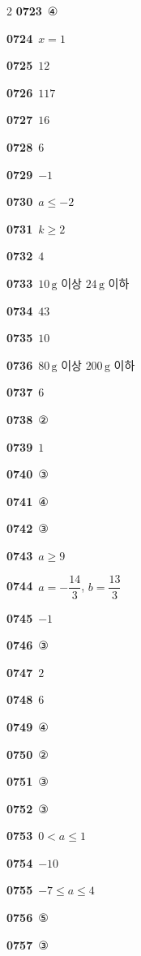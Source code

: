 \documentclass[10pt,a4paper]{article}
\begin{document}
\begin{multicols}{2}
\noindent\textbf{0723}\ ④\par
\noindent\textbf{0724}\ $x=1$\par
\noindent\textbf{0725}\ $12$\par
\noindent\textbf{0726}\ $117$\par
\noindent\textbf{0727}\ $16$\par
\noindent\textbf{0728}\ $6$\par
\noindent\textbf{0729}\ $-1$\par
\noindent\textbf{0730}\ $a\le -2$\par
\noindent\textbf{0731}\ $k\ge 2$\par
\noindent\textbf{0732}\ $4$\par
\noindent\textbf{0733}\ $10\,\mathrm{g}$ 이상 $24\,\mathrm{g}$ 이하\par
\noindent\textbf{0734}\ $43$\par
\noindent\textbf{0735}\ $10$\par
\noindent\textbf{0736}\ $80\,\mathrm{g}$ 이상 $200\,\mathrm{g}$ 이하\par
\noindent\textbf{0737}\ $6$\par
\noindent\textbf{0738}\ ②\par
\noindent\textbf{0739}\ $1$\par
\noindent\textbf{0740}\ ③\par
\noindent\textbf{0741}\ ④\par
\noindent\textbf{0742}\ ③\par
\noindent\textbf{0743}\ $a\ge 9$\par
\noindent\textbf{0744}\ $a=-\dfrac{14}{3}$, $b=\dfrac{13}{3}$\par
\noindent\textbf{0745}\ $-1$\par
\noindent\textbf{0746}\ ③\par
\noindent\textbf{0747}\ $2$\par
\noindent\textbf{0748}\ $6$\par
\noindent\textbf{0749}\ ④\par
\noindent\textbf{0750}\ ②\par
\noindent\textbf{0751}\ ③\par
\noindent\textbf{0752}\ ③\par
\noindent\textbf{0753}\ $0<a\le 1$\par
\noindent\textbf{0754}\ $-10$\par
\noindent\textbf{0755}\ $-7\le a\le 4$\par
\noindent\textbf{0756}\ ⑤\par
\noindent\textbf{0757}\ ③\par

\end{multicols}
\end{document}

